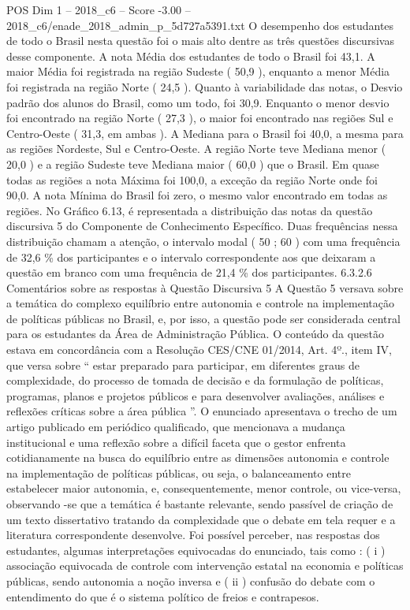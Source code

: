 \begin{textsample}{POS Dim 1 – 2018\_c6 – Score -3.00 – 2018\_c6/enade\_2018\_admin\_p\_5d727a5391.txt}
O desempenho dos estudantes de todo o Brasil nesta questão foi o mais alto dentre as três questões discursivas desse componente.
A nota Média dos estudantes de todo o Brasil foi 43,1.
A maior Média foi registrada na região Sudeste ( 50,9 ), enquanto a menor Média foi registrada na região Norte ( 24,5 ).
Quanto à variabilidade das notas, o Desvio padrão dos alunos do Brasil, como um todo, foi 30,9.
Enquanto o menor desvio foi encontrado na região Norte ( 27,3 ), o maior foi encontrado nas regiões Sul e Centro-Oeste ( 31,3, em ambas ).
A Mediana para o Brasil foi 40,0, a mesma para as regiões Nordeste, Sul e Centro-Oeste.
A região Norte teve Mediana menor ( 20,0 ) e a região Sudeste teve Mediana maior ( 60,0 ) que o Brasil.
Em quase todas as regiões a nota Máxima foi 100,0, a exceção da região Norte onde foi 90,0.
A nota Mínima do Brasil foi zero, o mesmo valor encontrado em todas as regiões.
No Gráfico 6.13, é representada a distribuição das notas da questão discursiva 5 do Componente de Conhecimento Específico.
Duas frequências nessa distribuição chamam a atenção, o intervalo modal ( 50 ; 60 ) com uma frequência de 32,6 \% dos participantes e o intervalo correspondente aos que deixaram a questão em branco com uma frequência de 21,4 \% dos participantes. 6.3.2.6 Comentários sobre as respostas à Questão Discursiva 5 A Questão 5 versava sobre a temática do complexo equilíbrio entre autonomia e controle na implementação de políticas públicas no Brasil, e, por isso, a questão pode ser considerada central para os estudantes da Área de Administração Pública.
O conteúdo da questão estava em concordância com a Resolução CES/CNE 01/2014, Art. 4º., item IV, que versa sobre “ estar preparado para participar, em diferentes graus de complexidade, do processo de tomada de decisão e da formulação de políticas, programas, planos e projetos públicos e para desenvolver avaliações, análises e reflexões críticas sobre a área pública ”.
O enunciado apresentava o trecho de um artigo publicado em periódico qualificado, que mencionava a mudança institucional e uma reflexão sobre a difícil faceta que o gestor enfrenta cotidianamente na busca do equilíbrio entre as dimensões autonomia e controle na implementação de políticas públicas, ou seja, o balanceamento entre estabelecer maior autonomia, e, consequentemente, menor controle, ou vice-versa, observando -se que a temática é bastante relevante, sendo passível de criação de um texto dissertativo tratando da complexidade que o debate em tela requer e a literatura correspondente desenvolve.
Foi possível perceber, nas respostas dos estudantes, algumas interpretações equivocadas do enunciado, tais como : ( i ) associação equivocada de controle com intervenção estatal na economia e políticas públicas, sendo autonomia a noção inversa e ( ii ) confusão do debate com o entendimento do que é o sistema político de freios e contrapesos.

\end{textsample}
